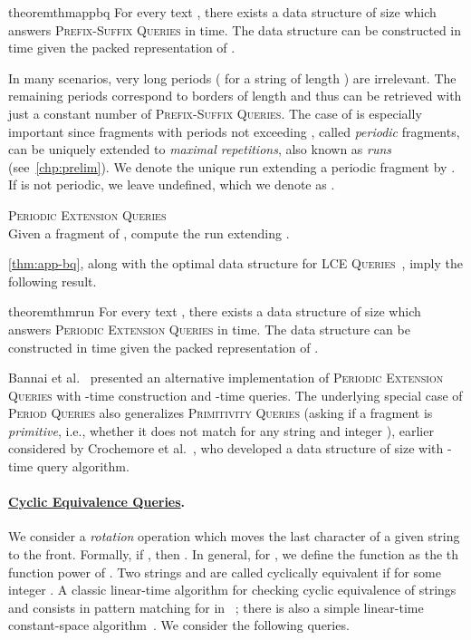 \documentclass[a4paper]{article}
\theoremstyle{definition}
\theoremstyle{remark}
\newcommand{\PQ}{\textsc{Period Queries}\xspace}
\newcommand{\BQ}{\textsc{Prefix-Suffix Queries}\xspace}
\newcommand{\PEQ}{\textsc{Periodic Extension Queries}\xspace}
\newcommand{\LCEQ}{\textsc{LCE Queries}\xspace}
\newenvironment{dsproblem}[1]
{\begin{center}\begin{lrbox}{\mybox}\begin{minipage}{0.96\columnwidth}{\textsc{#1}}\\}
{\end{minipage}\end{lrbox}\fbox{\usebox{\mybox}}\end{center}}
\newcommand{\defdsproblem}[2]{
  \begin{dsproblem}{#1}
#2
  \end{dsproblem}
  }
\begin{document}
\begin{restatable}{theorem}{thmappbq}\label{thm:app-bq}
For every text , there exists a data structure of size  which answers \BQ in  time. The data structure can be constructed in  time given the packed representation of .
\end{restatable}

In many scenarios, very long periods ( for a string of length ) are irrelevant.
The remaining periods correspond to borders of length  and thus can be retrieved with just a constant number of \BQ.
The case of  is especially important
since fragments  with periods not exceeding , called \emph{periodic} fragments, can be uniquely extended to \emph{maximal repetitions}, also known as \emph{runs} (see~\cref{chp:prelim}).
We denote the unique run extending a periodic fragment  by .
If  is not periodic, we leave  undefined, which we denote as .

\defdsproblem{\PEQ}{Given a fragment  of , compute the run  extending .}

\noindent
\cref{thm:app-bq}, along with the optimal data structure for \LCEQ~\cite{Kempa2019}, imply the following result.

\begin{restatable}{theorem}{thmrun}\label{thm:run}
  For every text , there exists a data structure of size  which answers \PEQ in  time. The data structure can be constructed in  time given the packed representation of .
\end{restatable}

Bannai et al.~\cite{DBLP:journals/siamcomp/BannaiIINTT17} presented an alternative implementation of \PEQ with -time construction and -time queries.
The underlying special case of \PQ also generalizes \textsc{Primitivity Queries}
(asking if a fragment  is \emph{primitive}, i.e., whether it does not match  for any string  and integer ),
earlier considered by Crochemore et al.~\cite{DBLP:journals/tcs/CrochemoreIKRRW14},
who developed a data structure of size  with  -time query algorithm.

\paragraph{\underline{Cyclic Equivalence Queries}.}
We consider a \emph{rotation} operation which moves the last character of a given string  to the front.
Formally, if , then .
In general, for , we define the  function as the th function power of .
Two strings  and  are called cyclically equivalent if  for some integer .
A classic linear-time algorithm for checking cyclic equivalence of strings  and  consists in pattern matching for  in ~\cite{DBLP:journals/ipl/Manacher76}; there is also a simple linear-time constant-space algorithm~\cite{Jewels}.
We consider the following queries.
\end{document}
